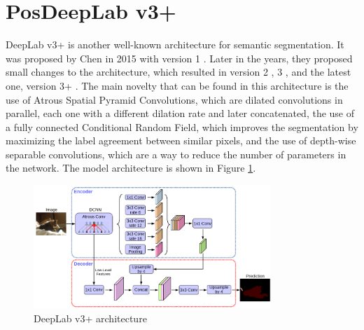 \section{PosDeepLab v3+}
DeepLab v3+ is another well-known architecture for semantic segmentation. It was
proposed by Chen \etal in 2015 with version 1 \cite{chen2014deeplab1}. Later in
the years, they proposed small changes to the architecture, which resulted in
version 2 \cite{chen2017deeplab2}, 3 \cite{chen2017deeplab3}, and the latest
one, version 3+ \cite{chen2018deeplab3p}. The main novelty that can be found in
this architecture is the use of Atrous Spatial Pyramid Convolutions, which are
dilated convolutions in parallel, each one with a different dilation rate and
later concatenated, the use of a fully connected Conditional Random Field, which
improves the segmentation by maximizing the label agreement between similar
pixels, and the use of depth-wise separable convolutions, which are a way to
reduce the number of parameters in the network. The model architecture is shown
in Figure \ref{fig:deeplabv3+}.
\begin{figure}[h]
  \centering
  \includegraphics[width=0.8\textwidth]{Images/DeepLabv3+.png}
  \caption{DeepLab v3+ architecture}
  \label{fig:deeplabv3+}
\end{figure}

